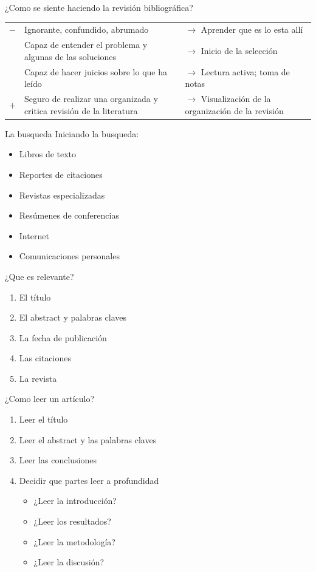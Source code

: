 \documentclass[
10pt,
aspectratio=169,
]{beamer}
\begin{document}
\begin{frame}[c]{¿Como se siente haciendo la revisi\'on bibliogr\'afica?}
\begin{table}
\begin{tabular}{ c p{.5\linewidth} p{.4\linewidth} }
$-$ & Ignorante, confundido, abrumado & $\longrightarrow$ Aprender que es lo esta all\'i \\
& Capaz de entender el problema y algunas de las soluciones & $\longrightarrow$ Inicio de la selecci\'on \\
& Capaz de hacer juicios sobre lo que ha le\'ido & $\longrightarrow$ Lectura activa; toma de notas \\
$+$ & Seguro de realizar una organizada y critica revisi\'on de la literatura & $\longrightarrow$ Visualizaci\'on de la organizaci\'on de la revisi\'on 
\end{tabular}
\end{table}
\end{frame}

\begin{frame}[c]{La busqueda}
Iniciando la busqueda:
\begin{itemize}
\item Libros de texto
\item Reportes de citaciones
\item Revistas especializadas
\item Res\'umenes de conferencias
\item Internet
\item Comunicaciones personales 
\end{itemize}
¿Que es relevante?
\begin{enumerate}
\item El t\'itulo
\item El abstract y palabras claves
\item La fecha de publicaci\'on
\item Las citaciones
\item La revista
\end{enumerate}
\end{frame}


\begin{frame}[c]{¿Como leer un art\'iculo?}
\begin{enumerate}
\item Leer el t\'itulo
\item Leer el abstract y las palabras claves
\item Leer las conclusiones
\item Decidir que partes leer a profundidad
\begin{itemize}
\item ¿Leer la introducci\'on?
\item ¿Leer los resultados?
\item ¿Leer la metodolog\'ia?
\item ¿Leer la discusi\'on?
\end{itemize}
\end{enumerate}
\end{frame}
\end{document}
